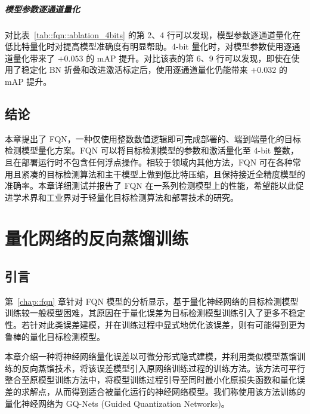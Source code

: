 \documentclass[
  fontset = source,
]{shtthesis}
\begin{document}
\paragraph{模型参数逐通道量化}
对比表~\ref{tab::fqn::ablation_4bits} 的第 2、4 行可以发现，模型参数逐通道量化在低比特量化时对提高模型准确度有明显帮助。4-bit 量化时，对模型参数使用逐通道量化带来了 $+0.053$ 的 mAP 提升。对比该表的第 6、9 行可以发现，即使在使用了稳定化 BN 折叠和改进激活标定后，使用逐通道量化仍能带来 $+0.032$ 的 mAP 提升。
\section{结论}
本章提出了 FQN，一种仅使用整数数值逻辑即可完成部署的、端到端量化的目标检测模型量化方案。FQN 可以将目标检测模型的参数和激活量化至 4-bit 整数，且在部署运行时不包含任何浮点操作。相较于领域内其他方法，FQN 可在各种常用且紧凑的目标检测算法和主干模型上做到低比特压缩，且保持接近全精度模型的准确率。本章详细测试并报告了 FQN 在一系列检测模型上的性能，希望能以此促进学术界和工业界对于轻量化目标检测算法和部署技术的研究。
\chapter{量化网络的反向蒸馏训练} \label{chap::gq_nets}
\section{引言}
第~\ref{chap::fqn} 章针对 FQN 模型的分析显示，基于量化神经网络的目标检测模型训练较一般模型困难，其原因在于量化误差为目标检测模型训练引入了更多不稳定性。若针对此类误差建模，并在训练过程中显式地优化该误差，则有可能得到更为鲁棒的量化目标检测模型。

本章介绍一种将神经网络量化误差以可微分形式隐式建模，并利用类似模型蒸馏训练的反向蒸馏技术，将该误差模型引入原网络训练过程的训练方法。该方法可平行整合至原模型训练方法中，将模型训练过程引导至同时最小化原损失函数和量化误差的求解点，从而得到适合被量化运行的神经网络模型。我们称使用该方法训练的量化神经网络为 GQ-Nets (Guided Quantization Networks)。
\end{document}

